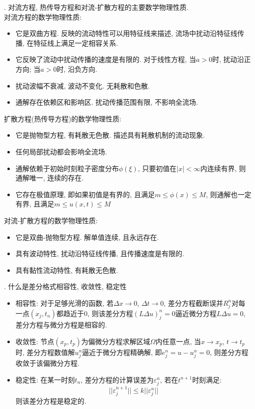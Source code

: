 . 对流方程, 热传导方程和对流-扩散方程的主要数学物理性质.\\
对流方程的数学物理性质:
\begin{itemize}
\item 它是双曲方程. 反映的流动特性可以用特征线来描述, 流场中扰动沿特征线传播, 在特征线上满足一定相容关系.
\item 它反映了流动中扰动传播的速度是有限的. 对于线性方程, 当$a>0$时, 扰动沿正方向; 当$a>0$时, 沿负方向.
\item 扰动波幅不衰减, 波动不变化. 无耗散和色散.
\item 通解存在依赖区和影响区. 扰动传播范围有限, 不影响全流场.
\end{itemize}
扩散方程(热传导方程)的数学物理性质:
\begin{itemize}
\item 它是抛物型方程, 有耗散无色散. 描述具有耗散机制的流动现象.
\item 任何局部扰动都会影响全流场.
\item 通解依赖于初始时刻粒子密度分布$\phi(\xi)$, 只要初值在$|x|<\infty$内连续有界, 则通解唯一, 连续的存在.
\item 它存在极值原理, 即如果初值是有界的, 且满足$m\leq \phi(x)\leq M$, 则通解也一定有界, 且满足$m\leq u(x,t)\leq M$
\end{itemize}
对流-扩散方程的数学物理性质:
\begin{itemize}
\item 它是双曲-抛物型方程. 解单值连续, 且永远存在.
\item 具有波动特性, 扰动沿特征线传播, 且传播速度是有限的.
\item 具有黏性流动特性, 有耗散无色散.
\end{itemize}
\vspace{1em}

. 什么是差分格式相容性, 收敛性, 稳定性
\begin{itemize}
\item 相容性: 对于足够光滑的函数, 若$\Delta x\rightarrow 0$, $\Delta t\rightarrow 0$, 差分方程截断误并$R_j^n$对每一点$(x_j, t_n)$都趋近于0, 则该差分方程$(L\Delta u)_j^n=0$逼近微分方程$L\Delta u=0$, 差分方程与微分方程是相容的.
\item 收敛性: 节点$(x_p, t_p)$为偏微分方程求解区域$\Omega$内任意一点, 当$x\rightarrow x_p$, $t\rightarrow t_p$时, 差分方程数值解$u_j^n$逼近于微分方程精确解, 即$e_j^n=u-u_j^n=0$, 则差分方程收敛于该偏微分方程.
\item 稳定性: 在某一时刻$t_n$, 差分方程的计算误差为$\varepsilon_j^n$, 若在$t^{n+1}$时刻满足:
    \[
    ||\varepsilon_j^{n+1}|| \leq k||\varepsilon_j^{n}||
    \]
    则该差分方程是稳定的.
\end{itemize}
\vspace{1em}

